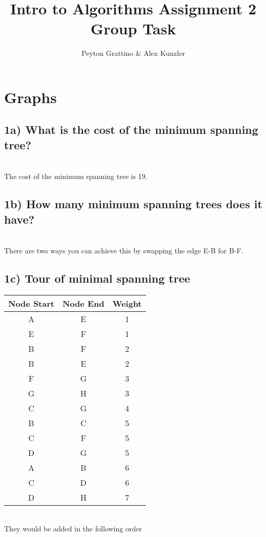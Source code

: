 \documentclass[12pt]{amsart}
\title{Intro to Algorithms Assignment 2 Group Task}
\author{Peyton Grattino \& Alex Kunzler}
\date{} %
\begin{document}
\maketitle
\tableofcontents
{}

\pagebreak
\setcounter{secnumdepth}{1}
\section{Graphs}
\subsection*{1a) \quad What is the cost of the minimum spanning tree?}
\leavevmode
\\ The cost of the minimum spanning tree is 19.

\subsection*{1b) \quad How many minimum spanning trees does it have?}
\leavevmode
\\ There are two ways you can achieve this by swapping the edge E-B for B-F.

\subsection*{1c) \quad Tour of minimal spanning tree}
\begin{center}
\begin{tabular}{ | c | c | c |}
\hline
Node Start & Node End & Weight \\
\hline
\hline
A & E & 1 \\
\hline
E & F & 1 \\
\hline
B & F & 2 \\
\hline
B & E & 2 \\
\hline
F & G & 3 \\
\hline
G & H & 3 \\
\hline
C & G & 4 \\
\hline
B & C & 5 \\
\hline
C & F & 5 \\
\hline
D & G & 5 \\
\hline
A & B & 6 \\
\hline
C & D & 6 \\
\hline
D & H & 7 \\
\hline
\end{tabular}
\leavevmode
\linebreak
\\ They would be added in the following order
\leavevmode
\end{center}
\end{document}
